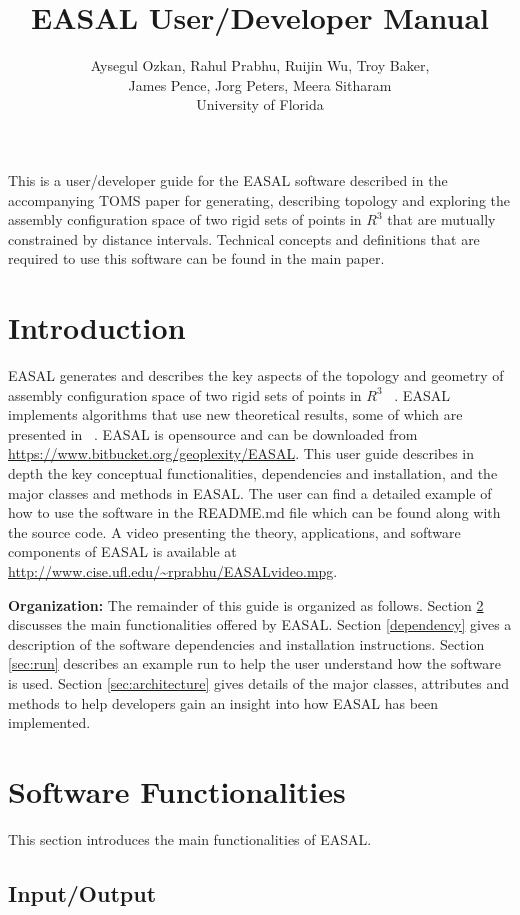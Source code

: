 \documentclass[10pt]{article}
\title{EASAL User/Developer Manual}
\author{Aysegul Ozkan, Rahul Prabhu, Ruijin Wu, Troy Baker, \\James Pence, Jorg
Peters, Meera Sitharam \\ University of Florida}
\begin{document}
\maketitle
This is a user/developer guide for the EASAL software described in
the accompanying TOMS paper for generating, describing topology and exploring the
assembly configuration space of two rigid sets of points in $R^3$ that are
mutually constrained by distance intervals. Technical concepts and definitions that are 
required to use this software can be found in the main paper.


\section{Introduction}
EASAL generates and describes the key aspects of the topology and geometry of
assembly configuration space of two rigid sets of points in $R^3$
~\cite{Sitharam:2012:EASAL, Ozkan2014MainEasal, Wu2014Virus}. EASAL implements
algorithms that use new theoretical results, some of which are presented in
~\cite{Ozkan2014MainEasal, SiGa:2010, Sitharam:2012:EASAL}.
EASAL is opensource and can be downloaded from
\url{https://www.bitbucket.org/geoplexity/EASAL}. This user guide describes in
depth the key conceptual functionalities, dependencies and installation, and
the major classes and methods in EASAL.  The user can find a detailed example
of how to use the software in the README.md file which can be found along with
the source code. A video presenting the theory, applications, and software
components of EASAL is available at
\url{http://www.cise.ufl.edu/~rprabhu/EASALvideo.mpg}.

\noindent\textbf{Organization:} The remainder of this guide is organized as
follows. Section \ref{functionalities} discusses the main functionalities
offered by EASAL. Section \ref{dependency} gives a description of the software
dependencies and installation instructions. Section \ref{sec:run} describes an
example run to help the user understand how the software is used.
Section \ref{sec:architecture} gives details of the major classes,
attributes and methods to help developers gain an insight into how EASAL  has
been implemented.

\section{Software Functionalities}
\label{functionalities}
This section introduces the main functionalities of EASAL.


\subsection{Input/Output}
\end{document}
